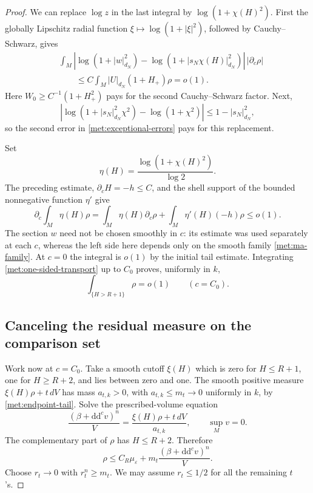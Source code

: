 \documentclass[11pt,letterpaper]{article}
\theoremstyle{definition}
\theoremstyle{remark}
\begin{document}
\begin{proof}
We can replace \(\log z\) in the last integral by
\(\log(1+\chi(H)^2)\).  First the globally Lipschitz radial function
\(\xi\mapsto\log(1+|\xi|^2)\), followed by Cauchy--Schwarz, gives
\begin{align*}
 &\int_M\left|
 \log(1+|w|_{d_N}^2)
 -\log(1+|s_N\chi(H)|_{d_N}^2)\right|\,|\partial_c\rho|\\
 &\hspace{2em}\leq
 C\int_M|U|_{d_N}(1+H_+)\rho=o(1).
\end{align*}
Here \(W_0\geq C^{-1}(1+H_+^2)\) pays for the second
Cauchy--Schwarz factor.  Next,
\[
 \left|\log(1+|s_N|_{d_N}^2\chi^2)-\log(1+\chi^2)\right|
 \leq1-|s_N|_{d_N}^2,
\]
so the second error in \eqref{met:exceptional-errors} pays for this
replacement.

Set
\[
 \eta(H)=\frac{\log(1+\chi(H)^2)}{\log2}.
\]
The preceding estimate, \(\partial_cH=-h\leq C\), and the shell
support of the bounded nonnegative function \(\eta'\) give
\begin{equation}
 \label{met:one-sided-transport}
 \partial_c\int_M\eta(H)\rho
 =\int_M\eta(H)\partial_c\rho
       +\int_M\eta'(H)(-h)\rho
 \leq o(1).
\end{equation}
The section \(w\) need not be chosen smoothly in \(c\): its estimate
was used separately at each \(c\), whereas the left side here
depends only on the smooth family \eqref{met:ma-family}.
At \(c=0\) the integral is \(o(1)\) by the initial tail estimate.
Integrating \eqref{met:one-sided-transport} up to \(C_0\) proves,
uniformly in \(k\),
\begin{equation}
 \label{met:endpoint-tail}
 \int_{\{H>R+1\}}\rho=o(1)
 \qquad(c=C_0).
\end{equation}

\subsection*{Canceling the residual measure on the comparison set}

Work now at \(c=C_0\).  Take a smooth cutoff \(\xi(H)\) which is zero
for \(H\leq R+1\), one for \(H\geq R+2\), and lies between zero
and one.  The smooth positive measure
\(\xi(H)\rho+t\,dV\) has mass \(a_{t,k}>0\), with
\(a_{t,k}\leq m_t\to0\) uniformly in \(k\), by
\eqref{met:endpoint-tail}.  Solve the prescribed-volume equation
\cite{YauCalabi}
\[
 \frac{(\beta+\mathrm{d}\mathrm{d}^{c} v)^n}{V}
     =\frac{\xi(H)\rho+t\,dV}{a_{t,k}},
 \qquad \sup_Mv=0.
\]
The complementary part of \(\rho\) has \(H\leq R+2\).  Therefore
\begin{equation}
 \label{met:residual-domination}
 \rho\leq C_R\mu_\varepsilon
       +m_t\frac{(\beta+\mathrm{d}\mathrm{d}^{c} v)^n}{V}.
\end{equation}
Choose \(r_t\to0\) with \(r_t^n\geq m_t\).  We may assume
\(r_t\leq1/2\) for all the remaining \(t\)'s.


\end{proof}
\end{document}
